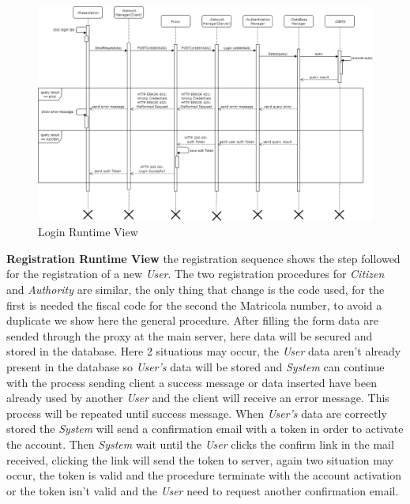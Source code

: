 \documentclass{article}
\begin{document}
\begin{figure}[H]
    \centering
    \includegraphics[scale=0.4]{img/sequence_diagrams/login_sequence.png}
    \caption{Login Runtime View}
\end{figure}  

\textbf{Registration Runtime View}  the registration sequence shows the step followed for the 
registration of a new \textit{User}. The two registration procedures for \textit{Citizen} and  
\textit{Authority} are similar, the only thing that change is the code used, for the first is 
needed the fiscal code for the second the Matricola number, to avoid a duplicate we show here 
the general procedure. After filling the form data are sended through the proxy at the main server, 
here data will be secured and stored in the database. Here 2 situations may occur, the \textit{User} 
data aren't already present in the database so \textit{User's} data will be stored and \textit{System} 
can continue with the process sending client a success message or data inserted have been already used 
by another \textit{User} and the client will receive an error message. This process will be repeated 
until success message. When \textit{User's} data are correctly stored the \textit{System} will send a 
confirmation email with a token in order to activate the account. Then \textit{System} wait until the 
\textit{User} clicks the confirm link in the mail received, clicking the link will send the token to 
server, again two situation may occur, the token is valid and the procedure terminate with the account 
activation or the token isn't valid and the \textit{User} need to request another confirmation email.
\end{document}
